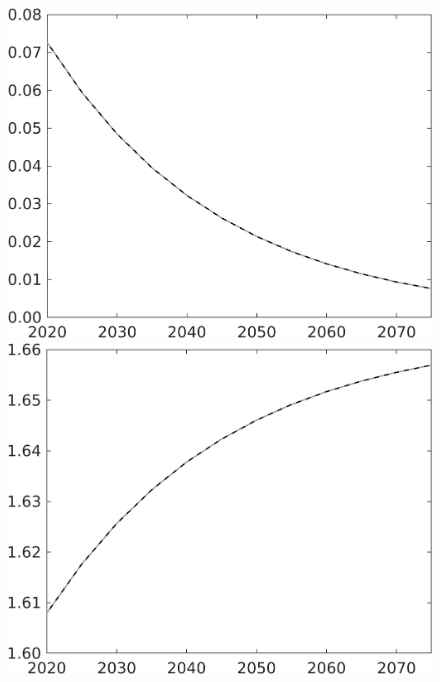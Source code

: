 \documentclass[12pt]{article}
\begin{document}
\begin{figure}[h!!]
\begin{minipage}[]{0.32\textwidth}
	\end{minipage}	
	\begin{minipage}[]{0.32\textwidth}
		\includegraphics[width=1\textwidth]{../../codding_model/own_basedOnFried/optimalPol_010922_revision/figures/all_13Sept22/CompTaul_Equlab_LFBAU_Reg0_pee_spillover0_nsk1_xgr1_knspil1_sep1_countec0_GovRev0_etaa0.79_lgd0.png}
	\end{minipage}	
	\begin{minipage}[]{0.32\textwidth}
		\includegraphics[width=1\textwidth]{../../codding_model/own_basedOnFried/optimalPol_010922_revision/figures/all_13Sept22/CompTaul_Equlab_LFBAU_Reg0_pn_spillover0_nsk1_xgr1_knspil1_sep1_countec0_GovRev0_etaa0.79_lgd0.png}

\end{minipage}
\end{figure}
\end{document}
